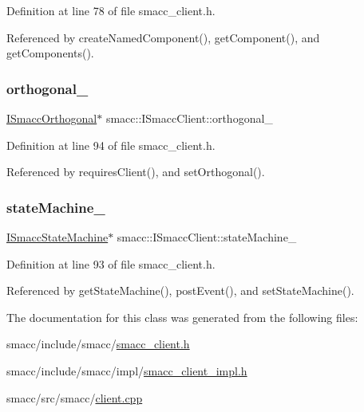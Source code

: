 Definition at line 78 of file smacc\+\_\+client.\+h.



Referenced by create\+Named\+Component(), get\+Component(), and get\+Components().

\mbox{\label{classsmacc_1_1ISmaccClient_a571c7f672d9c90128b5498aefc27c136}} 
\subsubsection{\texorpdfstring{orthogonal\+\_\+}{orthogonal\_}}
{\footnotesize\ttfamily \hyperlink{classsmacc_1_1ISmaccOrthogonal}{I\+Smacc\+Orthogonal}$\ast$ smacc\+::\+I\+Smacc\+Client\+::orthogonal\+\_\+\hspace{0.3cm}{\ttfamily [private]}}



Definition at line 94 of file smacc\+\_\+client.\+h.



Referenced by requires\+Client(), and set\+Orthogonal().

\mbox{\label{classsmacc_1_1ISmaccClient_a926e4f2ae796def63d48dca389a48c47}} 
\subsubsection{\texorpdfstring{state\+Machine\+\_\+}{stateMachine\_}}
{\footnotesize\ttfamily \hyperlink{classsmacc_1_1ISmaccStateMachine}{I\+Smacc\+State\+Machine}$\ast$ smacc\+::\+I\+Smacc\+Client\+::state\+Machine\+\_\+\hspace{0.3cm}{\ttfamily [private]}}



Definition at line 93 of file smacc\+\_\+client.\+h.



Referenced by get\+State\+Machine(), post\+Event(), and set\+State\+Machine().



The documentation for this class was generated from the following files\+:\begin{DoxyCompactItemize}
\item 
smacc/include/smacc/\hyperlink{smacc__client_8h}{smacc\+\_\+client.\+h}\item 
smacc/include/smacc/impl/\hyperlink{smacc__client__impl_8h}{smacc\+\_\+client\+\_\+impl.\+h}\item 
smacc/src/smacc/\hyperlink{client_8cpp}{client.\+cpp}\end{DoxyCompactItemize}
